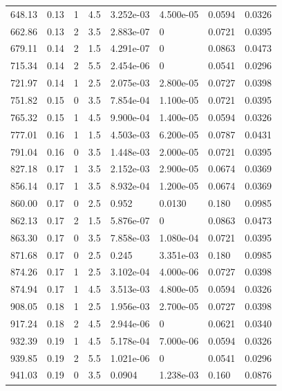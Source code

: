 \documentclass[preview]{standalone}
\begin{document}
{{{\begin{tabular}{L{1.2cm}C{1.2cm} C{0.3cm}C{0.5cm} C{1.4cm}C{1.4cm} C{1.4cm}C{1.4cm}}
  648.13  &  0.13  & 1     & 4.5 &  3.252e-03  & 4.500e-05  & 0.0594 &  0.0326   \\ 
  662.86  &  0.13  & 2     & 3.5 &  2.883e-07  & 0  & 0.0721 &  0.0395   \\ 
  679.11  &  0.14  & 2     & 1.5 &  4.291e-07  & 0  & 0.0863 &  0.0473   \\ 
  715.34  &  0.14  & 2     & 5.5 &  2.454e-06  & 0  & 0.0541 &  0.0296   \\ 
  721.97  &  0.14  & 1     & 2.5 &  2.075e-03  & 2.800e-05  & 0.0727 &  0.0398   \\ 
  751.82  &  0.15  & 0     & 3.5 &  7.854e-04  & 1.100e-05  & 0.0721 &  0.0395   \\ 
  765.32  &  0.15  & 1     & 4.5 &  9.900e-04  & 1.400e-05  & 0.0594 &  0.0326   \\ 
  777.01  &  0.16  & 1     & 1.5 &  4.503e-03  & 6.200e-05  & 0.0787 &  0.0431   \\ 
  791.04  &  0.16  & 0     & 3.5 &  1.448e-03  & 2.000e-05  & 0.0721 &  0.0395   \\ 
  827.18  &  0.17  & 1     & 3.5 &  2.152e-03  & 2.900e-05  & 0.0674 &  0.0369   \\ 
  856.14  &  0.17  & 1     & 3.5 &  8.932e-04  & 1.200e-05  & 0.0674 &  0.0369   \\ 
  860.00  &  0.17  & 0     & 2.5 &  0.952  & 0.0130  & 0.180 &  0.0985   \\ 
  862.13  &  0.17  & 2     & 1.5 &  5.876e-07  & 0  & 0.0863 &  0.0473   \\ 
  863.30  &  0.17  & 0     & 3.5 &  7.858e-03  & 1.080e-04  & 0.0721 &  0.0395   \\ 
  871.68  &  0.17  & 0     & 2.5 &  0.245  & 3.351e-03  & 0.180 &  0.0985   \\ 
  874.26  &  0.17  & 1     & 2.5 &  3.102e-04  & 4.000e-06  & 0.0727 &  0.0398   \\ 
  874.94  &  0.17  & 1     & 4.5 &  3.513e-03  & 4.800e-05  & 0.0594 &  0.0326   \\ 
  908.05  &  0.18  & 1     & 2.5 &  1.956e-03  & 2.700e-05  & 0.0727 &  0.0398   \\ 
  917.24  &  0.18  & 2     & 4.5 &  2.944e-06  & 0  & 0.0621 &  0.0340   \\ 
  932.39  &  0.19  & 1     & 4.5 &  5.178e-04  & 7.000e-06  & 0.0594 &  0.0326   \\ 
  939.85  &  0.19  & 2     & 5.5 &  1.021e-06  & 0  & 0.0541 &  0.0296   \\ 
  941.03  &  0.19  & 0     & 3.5 &  0.0904  & 1.238e-03  & 0.160 &  0.0876   \\ 

\end{tabular}}}}
\end{document}

